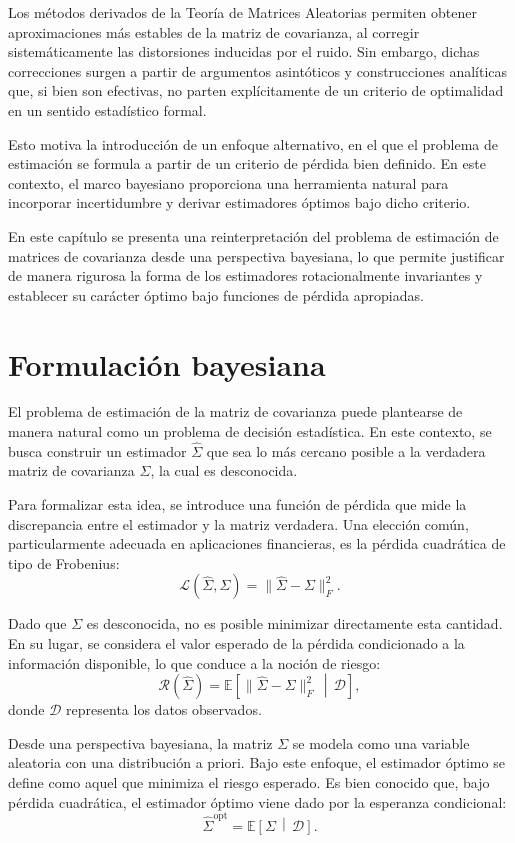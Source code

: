 \documentclass[letterpaper,12pt,oneside]{book}
\begin{document}
Los métodos derivados de la Teoría de Matrices Aleatorias permiten obtener aproximaciones más estables de la matriz de covarianza, al corregir sistemáticamente las distorsiones inducidas por el ruido. Sin embargo, dichas correcciones surgen a partir de argumentos asintóticos y construcciones analíticas que, si bien son efectivas, no parten explícitamente de un criterio de optimalidad en un sentido estadístico formal.

Esto motiva la introducción de un enfoque alternativo, en el que el problema de estimación se formula a partir de un criterio de pérdida bien definido. En este contexto, el marco bayesiano proporciona una herramienta natural para incorporar incertidumbre y derivar estimadores óptimos bajo dicho criterio.

En este capítulo se presenta una reinterpretación del problema de estimación de matrices de covarianza desde una perspectiva bayesiana, lo que permite justificar de manera rigurosa la forma de los estimadores rotacionalmente invariantes y establecer su carácter óptimo bajo funciones de pérdida apropiadas.

\section{Formulación bayesiana}

El problema de estimación de la matriz de covarianza puede plantearse de manera natural como un problema de decisión estadística. En este contexto, se busca construir un estimador $\widehat{\Sigma}$ que sea lo más cercano posible a la verdadera matriz de covarianza $\Sigma$, la cual es desconocida.

Para formalizar esta idea, se introduce una función de pérdida que mide la discrepancia entre el estimador y la matriz verdadera. Una elección común, particularmente adecuada en aplicaciones financieras, es la pérdida cuadrática de tipo de Frobenius:
\[
\mathcal{L}(\widehat{\Sigma}, \Sigma)
=
\|\widehat{\Sigma} - \Sigma\|_F^2.
\]

Dado que $\Sigma$ es desconocida, no es posible minimizar directamente esta cantidad. En su lugar, se considera el valor esperado de la pérdida condicionado a la información disponible, lo que conduce a la noción de riesgo:
\[
\mathcal{R}(\widehat{\Sigma})
=
\mathbb{E}
\left[
\|\widehat{\Sigma} - \Sigma\|_F^2
\,\middle|\,
\mathcal{D}
\right],
\]
donde $\mathcal{D}$ representa los datos observados.

Desde una perspectiva bayesiana, la matriz $\Sigma$ se modela como una variable aleatoria con una distribución a priori. Bajo este enfoque, el estimador óptimo se define como aquel que minimiza el riesgo esperado. Es bien conocido que, bajo pérdida cuadrática, el estimador óptimo viene dado por la esperanza condicional:
\[
\widehat{\Sigma}^{\text{opt}}
=
\mathbb{E}
\left[
\Sigma
\,\middle|\,
\mathcal{D}
\right].
\]
\end{document}
